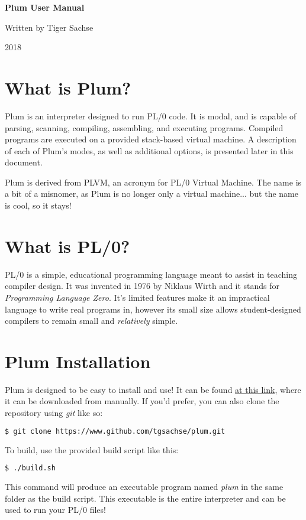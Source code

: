 \documentclass[12pt]{memoir}
\begin{document}
\pagestyle{empty}

\begin{vplace}[.7]
\begin{center}
{\Huge
    \textbf{Plum User Manual}
}

{\Large 
    Written by Tiger Sachse

    2018
}
\end{center}
\end{vplace}

\pagebreak

\pagestyle{plain}
\setcounter{page}{1}

\section*{What is Plum?}
Plum is an interpreter designed to run PL/0 code. It is modal, and is capable of parsing,
scanning, compiling, assembling, and executing programs. Compiled programs are executed
on a provided stack-based virtual machine. A description of each of Plum's modes, as well
as additional options, is presented later in this document.

Plum is derived from PLVM, an acronym for PL/0 Virtual Machine. The name is a bit of a
misnomer, as Plum is no longer only a virtual machine... but the name is cool, so it stays!

\section*{What is PL/0?}
PL/0 is a simple, educational programming language meant to assist in teaching compiler
design. It was invented in 1976 by Niklaus Wirth and it stands for
\textit{Programming Language Zero}. It's limited features make it an impractical language
to write real programs in, however its small size allows student-designed compilers to
remain small and \textit{relatively} simple.

\section*{Plum Installation}
Plum is designed to be easy to install and use! It can be found 
\href{https://www.github.com/tgsachse/plum}{at this link}, where it can be downloaded
from manually. If you'd prefer, you can also clone the repository using \emph{git} like so:
\begin{lstlisting}[language=bash]
$ git clone https://www.github.com/tgsachse/plum.git
\end{lstlisting}
To build, use the provided build script like this:
\begin{lstlisting}[language=bash]
$ ./build.sh
\end{lstlisting}
This command will produce an executable program named \emph{plum} in the same folder as
the build script. This executable is the entire interpreter and can be used to run
your PL/0 files!
\end{document}
